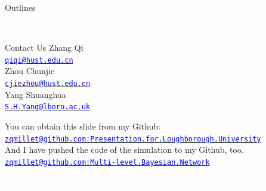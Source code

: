 \begin{frame}[noframenumbering]{Outlines}\label{Outlines}
    \setcounter{tocdepth}{1}
    \Bold
    \tableofcontents %
\end{frame}








\begin{frame}{}
    \label{Section: Thank You}
    \centering
    \vfill\vspace{1em}\textcolor{white}{\scshape Thank You!}\vfill
\end{frame}


\begin{frame}{Contact Us}
    \label{Thank You: Contact Us}
    Zhang Qi\\
    \href{mailto:qiqi@hust.edu.cn}{\textcolor{blue}{\tt \small qiqi@hust.edu.cn}}\\[10pt]

    Zhou Chunjie\\
    \href{mailto:cjiezhou@hust.edu.cn}{\textcolor{blue}{\tt \small cjiezhou@hust.edu.cn}}\\[10pt]

    Yang Shuanghua\\
    \href{mailto:S.H.Yang@lboro.ac.uk}{\textcolor{blue}{\tt \small S.H.Yang@lboro.ac.uk}}\\[20pt]

    \pause

    You can obtain this slide from my Github:\\
    \href{https://github.com/zqmillet/Presentation.for.Loughborough.University}{\tt \small \textcolor{blue}{zqmillet@github.com:Presentation.for.Loughborough.University}}\\[10pt]

    \pause
    And I have pushed the code of the simulation to my Github, too.\\
    \href{https://github.com/zqmillet/Multi-level.Bayesian.Network}{\tt \small \textcolor{blue}{zqmillet@github.com:Multi-level.Bayesian.Network}}\\[15pt]

\end{frame}

\begin{frame}{}
    \label{Section: Questions}
    \centering
    \vfill\vspace{1em}\textcolor{white}{\scshape Any Questions?}\vfill
\end{frame}




